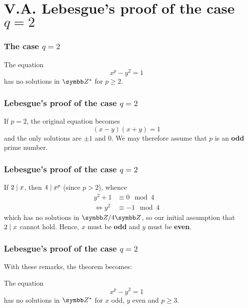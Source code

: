 \section{V.A. Lebesgue's proof of the case \texorpdfstring{\(q = 2\)}{q = 3}}

\begin{frame}
\frametitle{The case \texorpdfstring{\(q = 2\)}{q = 2}}

\begin{theorem}[V.A. Lebesgue, 1850]
The equation
\[
    x^p - y^2 = 1
\]
has no solutions in \(\integers^{*}\) for \(p \geq 2\).
\end{theorem}
\end{frame}

\begin{frame}
\frametitle{Lebesgue's proof of the case \texorpdfstring{\(q = 2\)}{q = 2}}

\begin{remark}
If \(p = 2\), the original equation becomes
\[
    (x - y)(x + y) = 1
\]
and the only solutions are \(\pm 1\) and \(0\). We may therefore assume that \(p\) is an \textbf{odd} prime number.
\end{remark}
\end{frame}

\begin{frame}
\frametitle{Lebesgue's proof of the case \texorpdfstring{\(q = 2\)}{q = 2}}

\begin{remark}
If \(2 \mid x\), then \(4 \mid x^p\) (since \(p > 2\)), whence
\begin{align*}
    y^2 + 1 &\equiv 0 \mod{4} \\
    \iff
    y^2 &\equiv -1 \mod{4}
\end{align*}
which has no solutions in \(\integers/4\integers\), so our initial assumption that \(2 \mid x\) cannot hold. Hence, \(x\) must be \textbf{odd} and \(y\) must be \textbf{even}.
\end{remark}
\end{frame}

\begin{frame}
\frametitle{Lebesgue's proof of the case \texorpdfstring{\(q = 2\)}{q = 2}}

With these remarks, the theorem becomes:
\begin{theorem}
The equation
\[
    x^p - y^2 = 1
\]
has no solutions in \(\integers^*\) for \(x\) odd, \(y\) even and \(p \geq 3\).
\end{theorem}
\end{frame}

